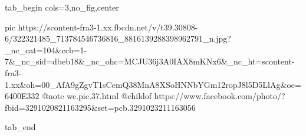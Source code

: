  
 
 
 
 


\ifcmt
  tab_begin cols=3,no_fig,center

     pic https://scontent-fra3-1.xx.fbcdn.net/v/t39.30808-6/322321485_713784546736816_8816139288398962791_n.jpg?_nc_cat=104&ccb=1-7&_nc_sid=dbeb18&_nc_ohc=MCJU36j3A0IAX8mKNx6&_nc_ht=scontent-fra3-1.xx&oh=00_AfA9gZgvT1sCemQ38MnA8XSoHNNbYGm12ropJ8l5D5LlAg&oe=6400E332
     @note we.pic.37.html
     @childof https://www.facebook.com/photo/?fbid=3291020821163295&set=pcb.3291023211163056

  tab_end
\fi

